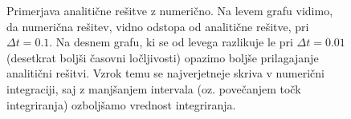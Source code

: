 \documentclass[slovene,11pt,a4paper]{article}
\numberwithin{equation}{section} %
\numberwithin{figure}{section} %
\numberwithin{table}{section} %
\begin{document}
\begin{figure}[h]
\noindent{}
\caption{Primerjava analitične rešitve z numerično. Na levem grafu vidimo, da numerična rešitev, vidno odstopa od analitične rešitve, pri $\Delta t=0.1$. Na desnem grafu, ki se od levega razlikuje le pri $\Delta t=0.01$ (desetkrat boljši časovni ločljivosti) opazimo boljše prilagajanje analitični rešitvi. Vzrok temu se najverjetneje skriva v numerični integraciji, saj z manjšanjem intervala (oz. povečanjem točk integriranja) ozboljšamo vrednost integriranja.}
\end{figure}
\end{document}
